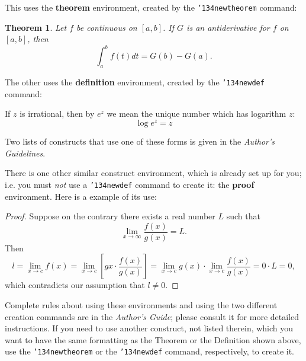 \documentclass{acm_proc_article-sp-sigmod09}
\begin{document}
This uses the \textbf{theorem} environment, created by
the \texttt{{\char'134}newtheorem} command:
\newtheorem{theorem}{Theorem}
\begin{theorem}
Let $f$ be continuous on $[a,b]$.  If $G$ is
an antiderivative for $f$ on $[a,b]$, then
\begin{displaymath}\int^b_af(t)dt = G(b) - G(a).\end{displaymath}
\end{theorem}

The other uses the \textbf{definition} environment, created
by the \texttt{{\char'134}newdef} command:
\begin{definition}
If $z$ is irrational, then by $e^z$ we mean the
unique number which has
logarithm $z$: \begin{displaymath}{\log e^z = z}\end{displaymath}
\end{definition}

Two lists of constructs that use one of these
forms is given in the
\textit{Author's  Guidelines}.

There is one other similar construct environment, which is
already set up
for you; i.e. you must \textit{not} use
a \texttt{{\char'134}newdef} command to
create it: the \textbf{proof} environment.  Here
is a example of its use:
\begin{proof}
Suppose on the contrary there exists a real number $L$ such that
\begin{displaymath}
\lim_{x\rightarrow\infty} \frac{f(x)}{g(x)} = L.
\end{displaymath}
Then
\begin{displaymath}
l=\lim_{x\rightarrow c} f(x)
= \lim_{x\rightarrow c}
\left[ g{x} \cdot \frac{f(x)}{g(x)} \right ]
= \lim_{x\rightarrow c} g(x) \cdot \lim_{x\rightarrow c}
\frac{f(x)}{g(x)} = 0\cdot L = 0,
\end{displaymath}
which contradicts our assumption that $l\neq 0$.
\end{proof}

Complete rules about using these environments and using the
two different creation commands are in the
\textit{Author's Guide}; please consult it for more
detailed instructions.  If you need to use another construct,
not listed therein, which you want to have the same
formatting as the Theorem
or the Definition\cite{salas:calculus} shown above,
use the \texttt{{\char'134}newtheorem} or the
\texttt{{\char'134}newdef} command,
respectively, to create it.
\end{document}
